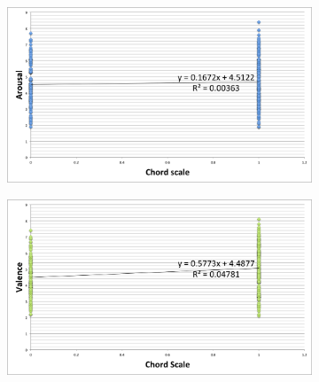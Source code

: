 \begin{figure}
             \begin{subfigure}[b]{0.48\textwidth}
                \includegraphics[width=\textwidth]{Figures/chordscale-arousal}
			   \vspace{20pt}
        \end{subfigure}
        \begin{subfigure}[b]{0.48\textwidth}
                \includegraphics[width=\textwidth]{Figures/chordscale-valence}
                  \vspace{20pt}
        \end{subfigure}
        
\end{figure}

